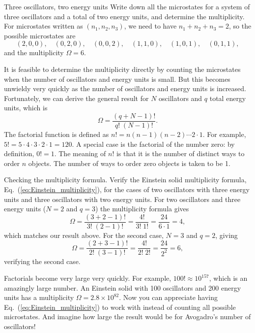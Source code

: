 \begin{example}{Three oscillators, two energy units}
  Write down all the microstates for a system of three oscillators and
  a total of two energy units, and determine the multiplicity.
  \solution 
  For microstates written as $(n_1,n_2,n_3)$, we need to have
  $n_1+n_2+n_3=2$, so the possible microstates are
\[
(2,0,0),\quad(0,2,0),\quad(0,0,2),\quad
(1,1,0),\quad(1,0,1),\quad(0,1,1),
\]
and the multiplicity $\Omega=6$.
\label{example:multiplicity}
\end{example}

It is feasible to determine the multiplicity directly by counting the
microstates when the number of oscillators and energy units is small.
But this becomes unwieldy very quickly as the number  of oscillators
and energy units is increased.  Fortunately, we can derive the general
result for $N$ oscillators and $q$ total energy units, which is
\begin{equation}
\Omega = \frac{(q+N-1)!}{q!\;(N-1)!}.
\label{eq:Einstein_multiplicity}
\end{equation}
The factorial function is defined as $n!=n(n-1)(n-2)\cdots 2\cdot 1$.
For example, $5!=5\cdot 4\cdot 3\cdot 2\cdot 1=120$.  A special
case is the factorial of the number zero:  by definition, 
$0!=1$.  The meaning of $n!$ is that it is the number of
distinct ways to order $n$ objects.  The number of ways to order zero
objects is taken to be 1.

\begin{example}{Checking the multiplicity formula.}
Verify the Einstein solid multiplicity formula,
Eq.~(\ref{eq:Einstein_multiplicity}), for the cases of two oscillators
with three energy units and three oscillators with two energy units.
\solution
For two oscillators and three energy units ($N=2$ and $q=3$) the
multiplicity formula gives
\begin{equation}
\Omega = \frac{(3+2-1)!}{3!\;(2-1)!} = \frac{4!}{3!\;1!} =
\frac{24}{6\cdot 1} = 4,
\end{equation}
which matches our result above.  For the second case, $N=3$ and $q=2$,
giving
\begin{equation}
\Omega = \frac{(2+3-1)!}{2!\;(3-1)!} = \frac{4!}{2!\;2!} = \frac{24}{2^2}
= 6,
\end{equation}
verifying the second case.
\end{example}

Factorials become very large very quickly.  For example, $100!\approx
10^{157}$, which is an amazingly large number.  An Einstein solid with
100 oscillators and 200 energy units has a multiplicity $\Omega =
2.8\times 10^{82}$.  Now you can appreciate having
Eq.~(\ref{eq:Einstein_multiplicity}) to work with instead of counting
all possible microstates.  And imagine how large the result would be
for Avogadro's number of oscillators!

